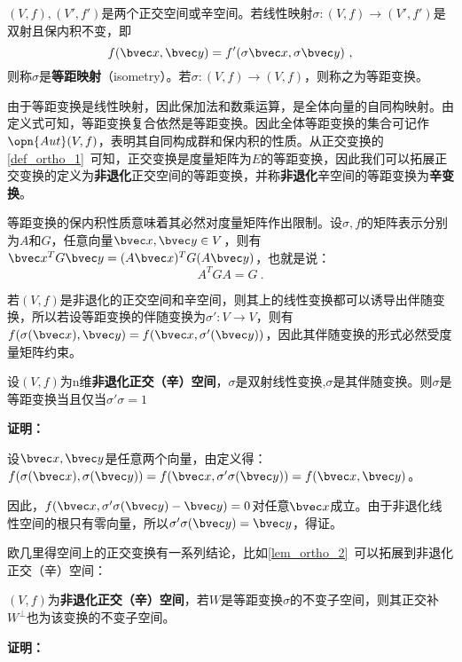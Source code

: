 


\begin{definition}{}
$(V,f),(V',f')$是两个正交空间或辛空间。若线性映射$\sigma:(V,f)\rightarrow (V',f')$是双射且保内积不变，即\begin{equation}
f(\bvec x,\bvec y)=f'(\sigma \bvec x,\sigma \bvec y)~,
\end{equation}
则称$\sigma $是\textbf{等距映射}（isometry）。若$\sigma:(V,f)\rightarrow (V,f)$，则称之为等距变换。
\end{definition}
由于等距变换是线性映射，因此保加法和数乘运算，是全体向量的自同构映射。由定义式可知，等距变换复合依然是等距变换。因此全体等距变换的集合可记作$\opn{Aut}(V,f)$，表明其自同构成群和保内积的性质。从正交变换的\autoref{def_ortho_1}~可知，正交变换是度量矩阵为$E$的等距变换，因此我们可以拓展正交变换的定义为\textbf{非退化}正交空间的等距变换，并称\textbf{非退化}辛空间的等距变换为\textbf{辛变换}。

等距变换的保内积性质意味着其必然对度量矩阵作出限制。设$\sigma,f$的矩阵表示分别为$A$和$G$，任意向量$\bvec x,\bvec y\in V$，则有$\bvec x^{T}G\bvec y=(A\bvec x)^TG(A\bvec y)$，也就是说：
\begin{equation}
A^TGA=G~.
\end{equation}

若$(V,f)$是非退化的正交空间和辛空间，则其上的线性变换都可以诱导出伴随变换，所以若设等距变换的伴随变换为$\sigma':V\rightarrow V$，则有$f(\sigma(\bvec x),\bvec y)=f(\bvec x,\sigma'(\bvec y))$，因此其伴随变换的形式必然受度量矩阵约束。
\begin{theorem}{}
设$(V,f)$为n维\textbf{非退化正交（辛）空间}，$\sigma$是双射线性变换,$\sigma$是其伴随变换。则$\sigma$是等距变换当且仅当$\sigma'\sigma=1$
\end{theorem}
\textbf{证明：}

设$\bvec x,\bvec y$是任意两个向量，由定义得：$f(\sigma(\bvec x),\sigma(\bvec y))=f(\bvec x,\sigma'\sigma(\bvec y))=f(\bvec x,\bvec y)$。

因此，$f(\bvec x,\sigma'\sigma(\bvec y)-\bvec y)=0$对任意$\bvec x$成立。由于非退化线性空间的根只有零向量，所以$\sigma'\sigma(\bvec y)=\bvec y$，得证。

欧几里得空间上的正交变换有一系列结论，比如\autoref{lem_ortho_2}~可以拓展到非退化正交（辛）空间：
\begin{theorem}{}
$(V,f)$为\textbf{非退化正交（辛）空间}，若$W$是等距变换$\sigma$的不变子空间，则其正交补$W^{\bot}$也为该变换的不变子空间。
\end{theorem}
\textbf{证明：}

